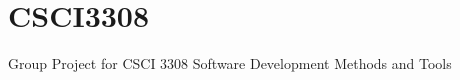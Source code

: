 \href{https://travis-ci.org/lalyon/csci3308}{\tt } \section*{C\+S\+C\+I3308}

Group Project for C\+S\+CI 3308 Software Development Methods and Tools 